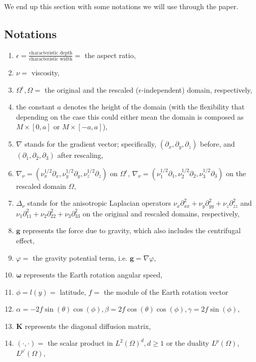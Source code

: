 \documentclass[11pt]{article}
\begin{document}
We end up this section with some notations we will use through the paper.

\subsection{Notations}

\begin{enumerate}

\item $\epsilon = \frac{\text{characteristic depth}}{\text{characteristic width}} = $ the aspect ratio,
\item $\nu = $ viscosity,
\item $\Omega^\epsilon, \Omega = $ the original and the rescaled ($\epsilon$-independent) domain, respectively,
\item the constant $a$ denotes the height of the domain (with the flexibility that depending on the case this could either mean the domain is composed as $M \times [0,a]$ or $M \times [-a, a]$),
\item $\nabla$ stands for the gradient vector; specifically, $(\partial_x, \partial_y, \partial_z)$ before, and $(\partial_1, \partial_2, \partial_3)$ after rescaling,
\item $\nabla_\nu = (\nu_x^{1/2} \partial_x, \nu_y^{1/2} \partial_y, \nu_z^{1/2} \partial_z)$ on $\Omega^\epsilon$, $\nabla_\nu = (\nu_1^{1/2} \partial_1, \nu_2^{1/2} \partial_2, \nu_3^{1/2} \partial_3)$ on the rescaled domain $\Omega,$
\item $ \Delta_\nu$ stands for the anisotropic Laplacian operators $\nu_x \partial^2_{xx} + \nu_y \partial^2_{yy} + \nu_z \partial^2_{zz}$ and $\nu_1 \partial^2_{11} + \nu_2 \partial^2_{22} + \nu_3 \partial^2_{33}$ on the original and rescaled domains, respectively,
\item $\mathbf{g}$ represents the force due to gravity, which also includes the centrifugal effect,
\item $\varphi = $ the gravity potential term, i.e. $\mathbf{g} = \nabla \varphi,$
\item $\mathbf{\omega}$ represents the Earth rotation angular speed,
\item $\phi = l(y) = $ latitude, $f = $ the module of the Earth rotation vector
\item $\alpha = -2 f \sin(\theta)\cos(\phi), \beta = 2 f \cos(\theta) \cos(\phi), \gamma = 2 f \sin(\phi),$
\item $\mathbf{K}$ represents the diagonal diffusion matrix,
\item $( \cdot,\cdot) = $ the scalar product in $L^2(\Omega)^d, d \geq 1$ or the duality $L^p (\Omega)$, $L^{p'} (\Omega),$

\end{enumerate}
\end{document}
